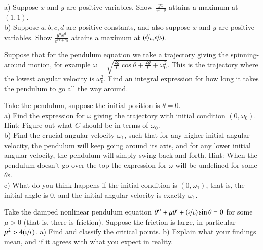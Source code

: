 \begin{exercise}
a) Suppose $x$ and $y$ are
positive variables.  Show $\frac{y x}{e^{x+y}}$
attains a maximum at $(1,1)$.\\
b) Suppose $a,b,c,d$ are positive constants, and also suppose $x$ and $y$ are
positive variables.  Show $\frac{y^a x^d}{e^{cx+by}}$
attains a maximum at $(\nicefrac{d}{c},\nicefrac{a}{b})$.
\end{exercise}

\begin{exercise}
Suppose that for the pendulum equation we take a trajectory giving the
spinning-around motion, for example $\omega = \sqrt{\frac{2g}{L} \cos \theta
+ \frac{2g}{L} + \omega_0^2}$.  This is the trajectory where the lowest
angular velocity is $\omega_0^2$.  Find an integral expression for how long it takes
the pendulum to go all the way around.
\end{exercise}


\begin{exercise}[challenging]
Take the pendulum, suppose the initial position is $\theta = 0$. \\
a) Find the expression for $\omega$ giving the trajectory
with initial condition $(0,\omega_0)$.  Hint: Figure out what $C$
should be in terms of $\omega_0$.\\
b) Find the crucial angular velocity $\omega_1$, such that
for any higher initial angular velocity,
the pendulum will keep going around its
axis, and for any lower initial angular velocity, the pendulum will simply
swing back and forth.
Hint: When the pendulum doesn't go over the top the expression for $\omega$
will be undefined for some $\theta$s.
\\
c) What do you think happens if the initial condition is $(0,\omega_1)$,
that is, the initial angle is 0, and the initial angular velocity is exactly
$\omega_1$.
\end{exercise}

\setcounter{exercise}{100}

\begin{exercise}
Take the damped nonlinear pendulum equation $\theta '' + \mu \theta' +
(\nicefrac{g}{L})
\sin \theta = 0$ for some $\mu > 0$ (that is, there is friction).
Suppose the friction is large, in particular $\mu^2 > 4 (\nicefrac{g}{L})$.
a) Find and classify the critical points.
b) Explain what your findings mean, and if it agrees with what you
expect in reality.
\end{exercise}

